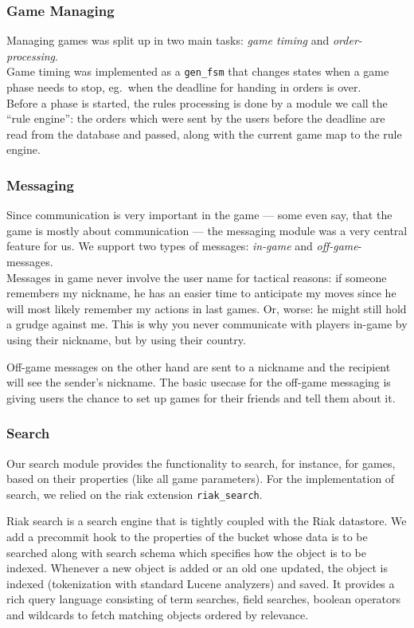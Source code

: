 \documentclass[11pt,a4paper]{report}
\begin{document}
\subsubsection{Game Managing}
Managing games was split up in two main tasks: {\em game timing\/} and
{\em order-processing}. \\
Game timing was implemented as a {\tt gen\_fsm} that changes states when a game
phase needs to stop, eg.\ when the deadline for handing in orders is over.\\
Before a phase is started, the rules processing is done by a module we call
the ``rule engine'': the orders which were sent by the users before the deadline
are read from the database and passed, along with the current game map to the
rule engine.
\subsubsection{Messaging}
Since communication is very important in the game --- some even say, that the
game is mostly about communication --- the messaging module was a very central
feature for us. We support two types of messages: {\em in-game\/} and
{\em off-game\/}-messages.\\
Messages in game never involve the user name for
tactical reasons: if someone remembers my nickname, he has an easier time to
anticipate my moves since he will most likely remember my actions in last games.
Or, worse: he might still hold a grudge against me. This is why you never
communicate with players in-game by using their nickname, but by using their
country.

Off-game messages on the other hand are sent to a nickname and the recipient
will see the sender's nickname. The basic usecase for the off-game messaging is
giving users the chance to set up games for their friends and tell them about
it.
\subsubsection{Search}
Our search module provides the functionality to search, for instance, for games,
based on their properties (like all game parameters). For the implementation of
search, we relied on the riak extension {\tt riak\_search}. 

Riak search is a search engine that is tightly coupled with the Riak datastore. We add a precommit hook to the properties of the bucket whose data is to be searched along with search schema which specifies how the object is to be indexed. Whenever a new object is added or an old one updated, the object is indexed (tokenization with standard Lucene analyzers) and saved. It provides a rich query language consisting of term searches, field searches, boolean operators and wildcards to fetch matching objects ordered by relevance.
\end{document}
